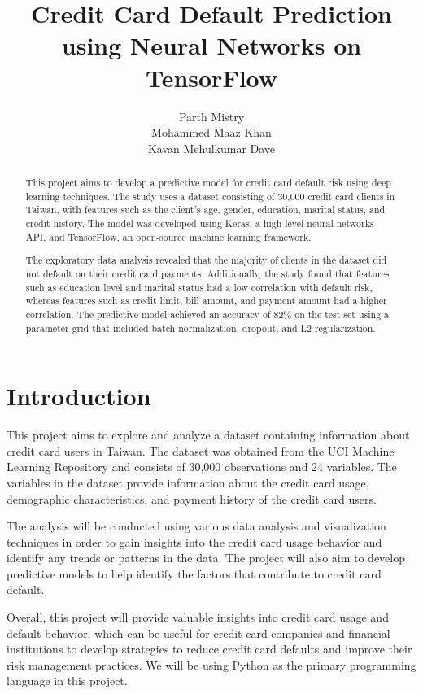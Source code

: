 \documentclass[12pt,a4paper,oneside]{article}
\title{Credit Card Default Prediction using Neural Networks on TensorFlow}
\author{Parth Mistry \\ Mohammed Maaz Khan \\ Kavan Mehulkumar Dave}
\begin{document}
	
	\begin{abstract}
		This project aims to develop a predictive model for credit card default risk using deep learning techniques. The study uses a dataset consisting of 30,000 credit card clients in Taiwan, with features such as the client's age, gender, education, marital status, and credit history. The model was developed using Keras, a high-level neural networks API, and TensorFlow, an open-source machine learning framework.
		
		The exploratory data analysis revealed that the majority of clients in the dataset did not default on their credit card payments. Additionally, the study found that features such as education level and marital status had a low correlation with default risk, whereas features such as credit limit, bill amount, and payment amount had a higher correlation. The predictive model achieved an accuracy of 82\% on the test set using a parameter grid that included batch normalization, dropout, and L2 regularization.
	\end{abstract}
	\newpage
	
	\tableofcontents\label{toc}
	\newpage
	
	\section{Introduction}
	This project aims to explore and analyze a dataset containing information about credit card users in Taiwan. The dataset\cite{dataset} was obtained from the UCI Machine Learning Repository and consists of 30,000 observations and 24 variables. The variables in the dataset provide information about the credit card usage, demographic characteristics, and payment history of the credit card users.
	
	The analysis will be conducted using various data analysis\cite{scipy} and visualization techniques in order to gain insights into the credit card usage behavior and identify any trends or patterns in the data. The project will also aim to develop predictive models to help identify the factors that contribute to credit card default.
	
	Overall, this project will provide valuable insights into credit card usage and default behavior, which can be useful for credit card companies and financial institutions to develop strategies to reduce credit card defaults and improve their risk management practices.
	We will be using Python\cite{python} as the primary programming language in this project.
	
\end{document}
